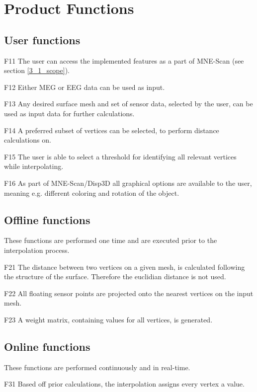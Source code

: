 \section{Product Functions}

\subsection{User functions}

	\begin{aims}
	
		\item[F11] The user can access the implemented features as a part of MNE-Scan (see section \ref{3_1_scope}).
		\item[F12] Either MEG or EEG data can be used as input.
		\item[F13] Any desired surface mesh and set of sensor data, selected by the user, can be used as input data for 							further calculations.
		\item[F14] A preferred subset of vertices can be selected, to perform distance calculations on. 
		\item[F15] The user is able to select a threshold for identifying all relevant vertices while interpolating. 
		\item[F16] As part of MNE-Scan/Disp3D all graphical options are available to the user, meaning e.g. different 								coloring and rotation of the object.
	
	\end{aims}

\subsection{Offline functions}
	
	These functions are performed one time and are executed prior to the interpolation process.	
	
	\begin{aims}
	
		\item[F21]	The distance between two vertices on a given mesh, is calculated following the structure of the surface. 						Therefore the euclidian distance is not used.
		\item[F22] All floating sensor points are projected onto the nearest vertices on the input mesh. 
		\item[F23] A weight matrix, containing values for all vertices, is generated. 
 	
	\end{aims}
	
\subsection{Online functions}

	These functions are performed continuously and in real-time.	
	
	\begin{aims}
	
		\item[F31]	Based off prior calculations, the interpolation assigns every vertex a value.
	
	\end{aims}